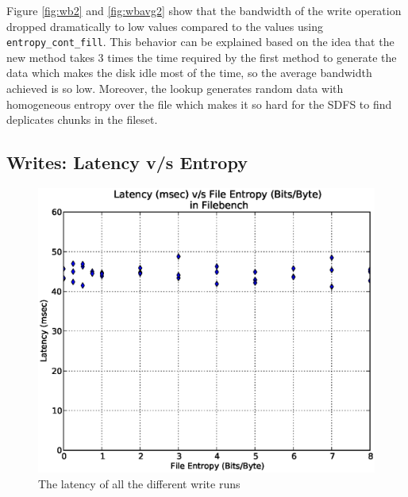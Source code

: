 \noindent Figure \ref{fig:wb2} and \ref{fig:wbavg2} show that the bandwidth of the write operation dropped dramatically to low values compared to the values using \verb+entropy_cont_fill+. This behavior can be explained based on the idea that the new method takes 3 times the time required by the first method to generate the data which makes the disk idle most of the time, so the average bandwidth achieved is so low. Moreover, the lookup generates random data with homogeneous entropy over the file which makes it so hard for the SDFS to find deplicates chunks in the fileset.

\subsection{Writes: Latency v/s Entropy}
\begin{figure}[H]
\begin{center}
\includegraphics[scale=.55]{../results/set2/write_latency_2.eps}
\caption{The latency of all the different write runs}
\label{fig:wl2}
\end{center}
\end{figure}



